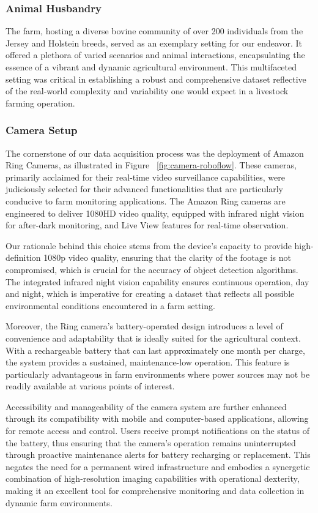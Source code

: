 \subsubsection*{Animal Husbandry}


The farm, hosting a diverse bovine community of over 200 individuals from the Jersey and Holstein breeds, served as an exemplary setting for our endeavor. It offered a plethora of varied scenarios and animal interactions, encapsulating the essence of a vibrant and dynamic agricultural environment. This multifaceted setting was critical in establishing a robust and comprehensive dataset reflective of the real-world complexity and variability one would expect in a livestock farming operation.

\subsubsection*{Camera Setup}


The cornerstone of our data acquisition process was the deployment of Amazon Ring Cameras, as illustrated in Figure ~\ref{fig:camera-roboflow}. These cameras, primarily acclaimed for their real-time video surveillance capabilities, were judiciously selected for their advanced functionalities that are particularly conducive to farm monitoring applications. The Amazon Ring cameras are engineered to deliver 1080HD video quality, equipped with infrared night vision for after-dark monitoring, and Live View features for real-time observation.

Our rationale behind this choice stems from the device's capacity to provide high-definition 1080p video quality, ensuring that the clarity of the footage is not compromised, which is crucial for the accuracy of object detection algorithms. The integrated infrared night vision capability ensures continuous operation, day and night, which is imperative for creating a dataset that reflects all possible environmental conditions encountered in a farm setting.

Moreover, the Ring camera's battery-operated design introduces a level of convenience and adaptability that is ideally suited for the agricultural context. With a rechargeable battery that can last approximately one month per charge, the system provides a sustained, maintenance-low operation. This feature is particularly advantageous in farm environments where power sources may not be readily available at various points of interest.

Accessibility and manageability of the camera system are further enhanced through its compatibility with mobile and computer-based applications, allowing for remote access and control. Users receive prompt notifications on the status of the battery, thus ensuring that the camera's operation remains uninterrupted through proactive maintenance alerts for battery recharging or replacement. This negates the need for a permanent wired infrastructure and embodies a synergetic combination of high-resolution imaging capabilities with operational dexterity, making it an excellent tool for comprehensive monitoring and data collection in dynamic farm environments.

